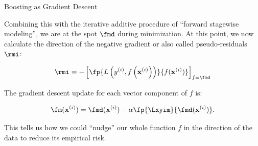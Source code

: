 \begin{vbframe}{Boosting as Gradient Descent}

\vspace*{0.2cm}
Combining this with the iterative additive procedure
of \enquote{forward stagewise modeling}, we are at the spot $\fmd$ during minimization.
At this point, we now calculate the direction of the negative gradient or also called pseudo-residuals $\rmi$:

$$ \rmi = -\left[\fp{\Lxyi}{f(\xi)}\right]_{f=\fmd} $$

\lz

The gradient descent update for each vector component of $f$ is:

$$
  \fm (\xi) =  \fmd (\xi) - \alpha \fp{\Lxyim}{\fmd (\xi)}.
$$

This tells us how we could \enquote{nudge} our whole function $f$ in the direction of the data to
reduce its empirical risk.

\end{vbframe}


